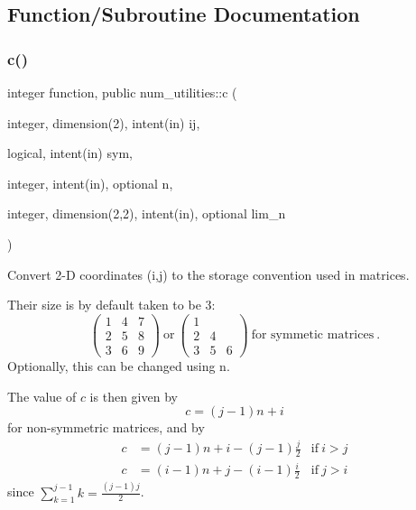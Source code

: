 \subsection{Function/\+Subroutine Documentation}
\mbox{\label{namespacenum__utilities_a5ee3fbd1fe67d0deefc7194631389f2a}} 
\subsubsection{\texorpdfstring{c()}{c()}}
{\footnotesize\ttfamily integer function, public num\+\_\+utilities\+::c (\begin{DoxyParamCaption}\item[{integer, dimension(2), intent(in)}]{ij,  }\item[{logical, intent(in)}]{sym,  }\item[{integer, intent(in), optional}]{n,  }\item[{integer, dimension(2,2), intent(in), optional}]{lim\+\_\+n }\end{DoxyParamCaption})}



Convert 2-\/D coordinates (i,j) to the storage convention used in matrices. 

Their size is by default taken to be 3\+: \[ \left(\begin{array}{ccc} 1 & 4 & 7 \\ 2 & 5 & 8 \\ 3 & 6 & 9 \end{array}\right) \ \text{or} \ \left(\begin{array}{ccc} 1 & & \\ 2 & 4 & \\ 3 & 5 & 6 \end{array}\right) \ \text{for symmetic matrices} \ . \] Optionally, this can be changed using {\ttfamily n}.

The value of $c$ is then given by \[c = (j-1) n + i\] for non-\/symmetric matrices, and by \[\begin{aligned} c &= (j-1)n + i - (j-1)\frac{j}{2} & \text{if} \ i > j \\ c &= (i-1)n + j - (i-1)\frac{i}{2} & \text{if} \ j > i \end{aligned}\] since $\sum_{k=1}^{j-1} k = \frac{(j-1)j}{2}$.

